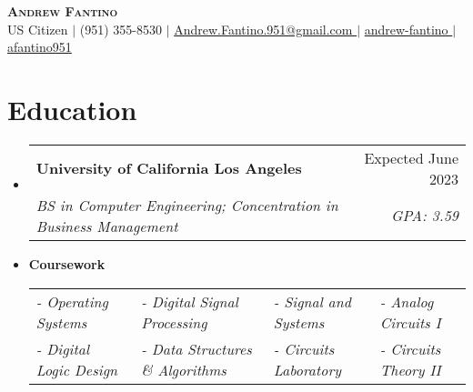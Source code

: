 \documentclass[letterpaper,11pt]{article}
\makeatletter
\newcommand{\resumeSubheading}[4]{
  \vspace{-2pt}\item
    \begin{tabular*}{0.97\textwidth}[t]{l@{\extracolsep{\fill}}r}
      \textbf{#1} & #2 \\
      \textit{\small#3} & \textit{\small #4} \\
    \end{tabular*}\vspace{-7pt}
}
\newcommand{\resumeSubHeadingListStart}{\begin{itemize}[leftmargin=0.15in, label={}]}
\newcommand{\resumeSubHeadingListEnd}{\end{itemize}}
\makeatother
\begin{document}

\begin{center}
    \textbf{\Huge \scshape Andrew Fantino} \\ \vspace{5pt}
    \small US Citizen $|$
    \small {} (951) 355-8530 $|$ 
    \href{mailto:andrew.fantino.951@gmail.com}{  Andrew.Fantino.951@gmail.com } $|$ 
    \href{https://linkedin.com/in/andrew-fantino/}{  andrew-fantino } $|$
    \href{https://github.com/afantino951}{  afantino951} 
\end{center}
\vspace*{-1.5em}

\section{Education}
  \resumeSubHeadingListStart
    \resumeSubheading
      {University of California Los Angeles}{Expected June 2023}
      {BS in Computer Engineering; Concentration in Business Management}{GPA: 3.59}
      \vspace{-2pt}\item
      \textbf{Coursework} \\
      \begin{tabular*}{0.97\textwidth}{ p{10em} p{13em} p{10em} p{8em} }
        \textit{\small- Operating Systems} & \textit{\small- Digital Signal Processing} & \textit{\small- Signal and Systems} & \textit{\small- Analog Circuits I} \\
        \textit{\small- Digital Logic Design} & \textit{\small- Data Structures \& Algorithms} & \textit{\small- Circuits Laboratory} & \textit{\small- Circuits Theory II} \\
      \end{tabular*}\vspace{-7pt}

  \resumeSubHeadingListEnd

\end{document}
